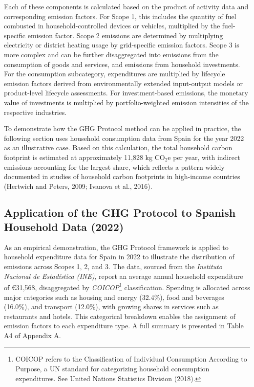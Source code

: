 \documentclass[12pt,a4paper]{article}%
\begin{document}
Each of these components is calculated based on the product of activity data and corresponding emission factors. For Scope 1, this includes the quantity of fuel combusted in household-controlled devices or vehicles, multiplied by the fuel-specific emission factor. Scope 2 emissions are determined by multiplying electricity or district heating usage by grid-specific emission factors. Scope 3 is more complex and can be further disaggregated into emissions from the consumption of goods and services, and emissions from household investments. For the consumption subcategory, expenditures are multiplied by lifecycle emission factors derived from environmentally extended input-output models or product-level lifecycle assessments. For investment-based emissions, the monetary value of investments is multiplied by portfolio-weighted emission intensities of the respective industries.

To demonstrate how the GHG Protocol method can be applied in practice, the following section uses household consumption data from Spain for the year 2022 as an illustrative case. Based on this calculation, the total household carbon footprint is estimated at approximately 11,828 kg CO$_2$e per year, with indirect emissions accounting for the largest share, which reflects a pattern widely documented in studies of household carbon footprints in high-income countries (Hertwich and Peters, 2009; Ivanova et al., 2016). 
\subsection{Application of the GHG Protocol to Spanish Household Data (2022)}

As an empirical demonstration, the GHG Protocol framework is applied to household expenditure data for Spain in 2022 to illustrate the distribution of emissions across Scopes 1, 2, and 3. The data, sourced from the \textit{Instituto Nacional de Estadística (INE)}, report an average annual household expenditure of €31,568, disaggregated by \textit{COICOP}\footnote{COICOP refers to the Classification of Individual Consumption According to Purpose, a UN standard for categorizing household consumption expenditures. See United Nations Statistics Division (2018).} classification. Spending is allocated across major categories such as housing and energy (32.4\%), food and beverages (16.0\%), and transport (12.0\%), with growing shares in services such as restaurants and hotels. This categorical breakdown enables the assignment of emission factors to each expenditure type. A full summary is presented in Table A4 of Appendix A.
\end{document}
